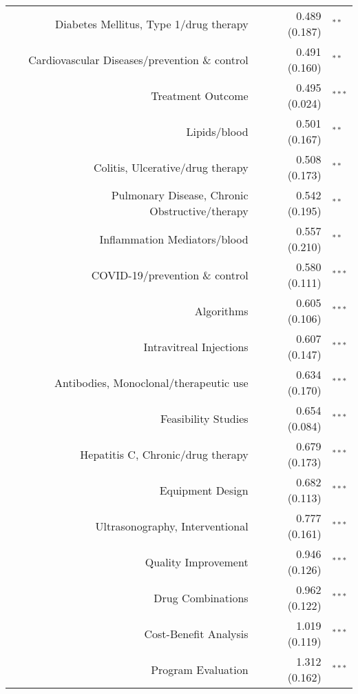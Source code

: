 \begin{longtable}[l]{rr@{}l@{ }}
Diabetes Mellitus, Type 1/drug therapy & 0.489 (0.187) & $^{**}$\\
Cardiovascular Diseases/prevention \& control & 0.491 (0.160) & $^{**}$\\
Treatment Outcome & 0.495 (0.024) & $^{***}$\\
Lipids/blood & 0.501 (0.167) & $^{**}$\\
Colitis, Ulcerative/drug therapy & 0.508 (0.173) & $^{**}$\\
Pulmonary Disease, Chronic Obstructive/therapy & 0.542 (0.195) & $^{**}$\\
Inflammation Mediators/blood & 0.557 (0.210) & $^{**}$\\
COVID-19/prevention \& control & 0.580 (0.111) & $^{***}$\\
Algorithms & 0.605 (0.106) & $^{***}$\\
Intravitreal Injections & 0.607 (0.147) & $^{***}$\\
Antibodies, Monoclonal/therapeutic use & 0.634 (0.170) & $^{***}$\\
Feasibility Studies & 0.654 (0.084) & $^{***}$\\
Hepatitis C, Chronic/drug therapy & 0.679 (0.173) & $^{***}$\\
Equipment Design & 0.682 (0.113) & $^{***}$\\
Ultrasonography, Interventional & 0.777 (0.161) & $^{***}$\\
Quality Improvement & 0.946 (0.126) & $^{***}$\\
Drug Combinations & 0.962 (0.122) & $^{***}$\\
Cost-Benefit Analysis & 1.019 (0.119) & $^{***}$\\
Program Evaluation & 1.312 (0.162) & $^{***}$\\
\end{longtable} \pagebreak
